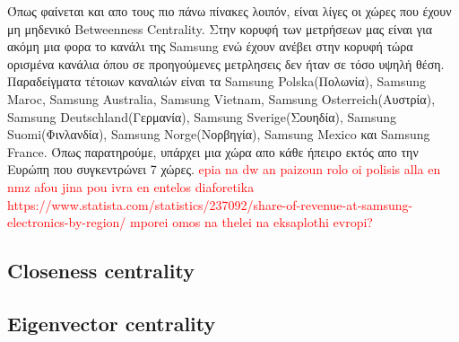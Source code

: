 \documentclass[12pt]{article}
\begin{document}
	\vspace{12pt}
	Όπως φαίνεται και απο τους πιο πάνω πίνακες λοιπόν, είναι λίγες οι χώρες που έχουν μη μηδενικό Betweenness Centrality. Στην κορυφή των μετρήσεων μας είναι για ακόμη μια φορα το κανάλι της Samsung ενώ έχουν ανέβει στην κορυφή τώρα ορισμένα κανάλια όπου σε προηγούμενες μετρλησεις δεν ήταν σε τόσο υψηλή θέση. Παραδείγματα τέτοιων καναλιών είναι τα Samsung Polska(Πολωνία), Samsung Maroc, Samsung Australia, Samsung Vietnam, Samsung Osterreich(Αυστρία), Samsung Deutschland(Γερμανία), Samsung Sverige(Σουηδία), Samsung Suomi(Φινλανδία), Samsung Norge(Νορβηγία), Samsung Mexico και Samsung France. Όπως παρατηρούμε, υπάρχει μια χώρα απο κάθε ήπειρο εκτός απο την Ευρώπη που συγκεντρώνει 7 χώρες. \textcolor{red}{epia na dw an paizoun rolo oi polisis alla en nmz afou jina pou ivra en entelos diaforetika
	https://www.statista.com/statistics/237092/share-of-revenue-at-samsung-electronics-by-region/
	mporei omos na thelei na eksaplothi evropi?}
	
	\newpage
	\subsection{Closeness centrality}
	
	

	
	
	
	
	\subsection{Eigenvector centrality}
	
	
	\label{chap:centrality_measures_7}
	
	
	
\end{document}
